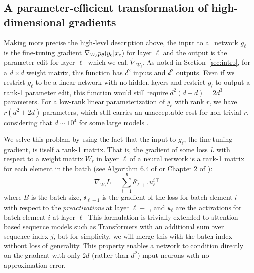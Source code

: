 \documentclass{article}
\begin{document}
\subsection{A parameter-efficient transformation of high-dimensional gradients}



Making more precise the high-level description above, the input to a \name~network $g_\ell$ is the fine-tuning gradient $\nabla_{W_\ell} p_\theta(y_\text{e}|x_\text{e})$ for layer $\ell$ and the output is the parameter edit for layer $\ell$, which we call $\tilde\nabla_{W_\ell}$. As noted in Section~\ref{sec:intro}, for a $d \times d$ weight matrix, this function has $d^2$ inputs and $d^2$ outputs. Even if we restrict $g_\ell$ to be a linear network with no hidden layers and restrict $g_\ell$ to output a rank-1 parameter edit, this function would still require $d^2(d+d) = 2d^3$ parameters. For a low-rank linear parameterization of $g_\ell$ with rank $r$, we have $r(d^2 + 2d)$ parameters, which still carries an unacceptable cost for non-trivial $r$, considering that $d\sim 10^4$ for some large models \citep{radford2019language,2020t5}.

We solve this problem by using the fact that the input to $g_\ell$, the fine-tuning gradient, is itself a rank-1 matrix. That is, the gradient of some loss $L$ with respect to a weight matrix $W_{\ell}$ in layer $\ell$ of a neural network is a rank-1 matrix for each element in the batch (see Algorithm 6.4 of \cite{Goodfellow-et-al-2016} or Chapter 2 of \cite{nielsen2015neural}):
\begin{equation}
    \nabla_{W_\ell}L = \sum_{i=1}^B\delta_{\ell + 1}^i{u_\ell^{i\,\top}}
\end{equation}
where $B$ is the batch size, $\delta_{\ell+1}$ is the gradient of the loss for batch element $i$ with respect to the \textit{preactivations} at layer $\ell+1$, and $u_\ell$ are the activations for batch element $i$ at layer $\ell$. This formulation is trivially extended to attention-based sequence models such as Transformers \citep{vaswani2017attention,radford2019language} with an additional sum over sequence index $j$, but for simplicity, we will merge this with the batch index without loss of generality. This property enables a network to condition directly on the gradient with only $2d$ (rather than $d^2$) input neurons with no approximation error.
\end{document}
